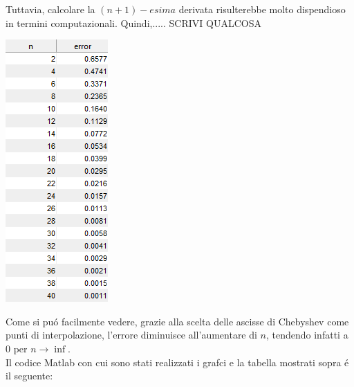 \noindent Tuttavia, calcolare la $(n+1)-esima$ derivata risulterebbe molto dispendioso in termini computazionali. Quindi,..... SCRIVI QUALCOSA

\begin{center}
	\includegraphics[scale=0.7]{cap4/4_7/4_7_error.png}
\end{center}

\noindent Come si pu\'o facilmente vedere, grazie alla scelta delle ascisse di Chebyshev come punti di interpolazione, l'errore diminuisce all'aumentare di \(n\), tendendo infatti a \(0\) per \(n \to \inf\).\\

\noindent Il codice Matlab con cui sono stati realizzati i grafci e la tabella mostrati sopra \'e il seguente: \\


